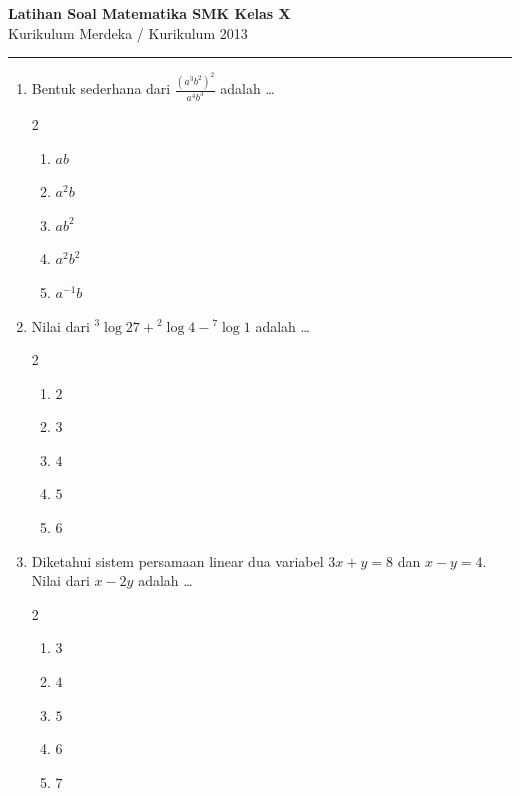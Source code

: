 \documentclass[12pt,a4paper]{article}
\begin{document}
\begin{center}
    \Large \textbf{\textsf{Latihan Soal Matematika SMK Kelas X}}\\
    \normalsize \textsf{Kurikulum Merdeka / Kurikulum 2013}
    \vspace{0.2cm}\\
    \rule{0.8\textwidth}{0.8pt}
\end{center}
\vspace{0.5cm}

\begin{enumerate}[itemsep=2ex]
    \item Bentuk sederhana dari $\displaystyle \frac{(a^3 b^2)^2}{a^4 b^3}$ adalah \dots
    \begin{multicols}{2}
    \begin{enumerate}[label=\Alph*.]
        \item $a b$
        \item $a^2 b$
        \item $a b^2$
        \item $a^2 b^2$
        \item $a^{-1} b$
    \end{enumerate}
    \end{multicols}

    \item Nilai dari ${}^3\log 27 + {}^2\log 4 - {}^7\log 1$ adalah \dots
    \begin{multicols}{2}
    \begin{enumerate}[label=\Alph*.]
        \item $2$
        \item $3$
        \item $4$
        \item $5$
        \item $6$
    \end{enumerate}
    \end{multicols}

    \item Diketahui sistem persamaan linear dua variabel $3x + y = 8$ dan $x - y = 4$. Nilai dari $x - 2y$ adalah \dots
    \begin{multicols}{2}
    \begin{enumerate}[label=\Alph*.]
        \item $3$
        \item $4$
        \item $5$
        \item $6$
        \item $7$
    \end{enumerate}
    \end{multicols}


\end{enumerate}
\end{document}
